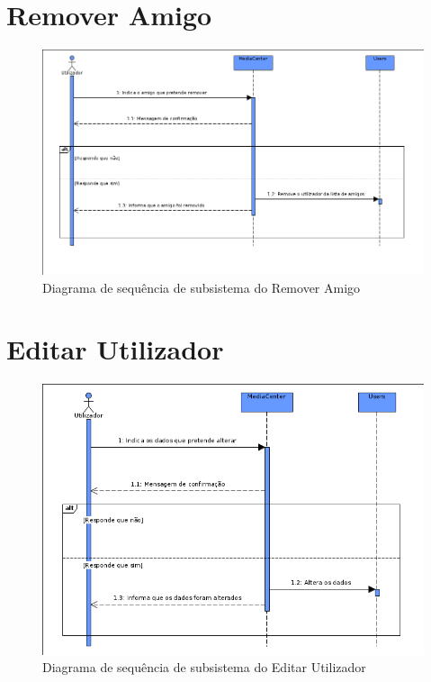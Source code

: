 \documentclass[a4paper]{report}
\begin{document}
\section{Remover Amigo}

\begin{figure}[H]
	\centering 
    \includegraphics[width=\textwidth]{images/remamigoSub.png}  
    \caption{Diagrama de sequência de subsistema do Remover Amigo}
\end{figure}

\section{Editar Utilizador}

\begin{figure}[H]
	\centering 
    \includegraphics[width=\textwidth]{images/edituserSub.png}  
    \caption{Diagrama de sequência de subsistema do Editar Utilizador}
\end{figure}
\end{document}
